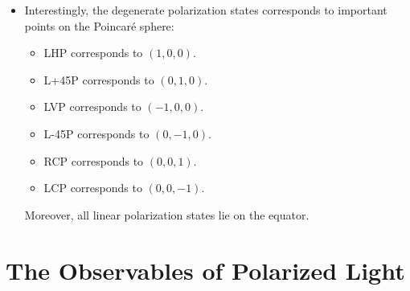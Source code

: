 \documentclass[10pt]{article}
\begin{document}
\begin{itemize}
		\item Interestingly, the degenerate polarization states corresponds to important points on the Poincar\'{e} sphere:
		\begin{itemize}
			\item LHP corresponds to $(1,0,0)$.
			\item L+45P corresponds to $(0,1,0)$.
			\item LVP corresponds to $(-1,0,0)$.
			\item L-45P corresponds to $(0,-1,0)$.
			\item RCP corresponds to $(0,0,1)$.
			\item LCP corresponds to $(0,0,-1)$.
		\end{itemize}
		Moreover, all linear polarization states lie on the equator.
	\end{itemize}

	\section{The Observables of Polarized Light}
\end{document}
